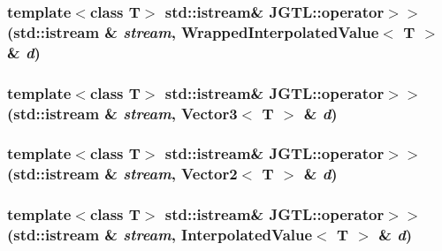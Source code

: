 \hypertarget{namespace_j_g_t_l_26e27f07434450b794de382d8b607b25}{
\subsubsection[operator$>$$>$]{\setlength{\rightskip}{0pt plus 5cm}template$<$class T$>$ std::istream\& JGTL::operator$>$$>$ (std::istream \& {\em stream}, Wrapped\-Interpolated\-Value$<$ T $>$ \& {\em d})}}
\label{namespace_j_g_t_l_26e27f07434450b794de382d8b607b25}


\hypertarget{namespace_j_g_t_l_08552e8d16a63eaef00c7e3062af4ab0}{
\subsubsection[operator$>$$>$]{\setlength{\rightskip}{0pt plus 5cm}template$<$class T$>$ std::istream\& JGTL::operator$>$$>$ (std::istream \& {\em stream}, Vector3$<$ T $>$ \& {\em d})}}
\label{namespace_j_g_t_l_08552e8d16a63eaef00c7e3062af4ab0}


\hypertarget{namespace_j_g_t_l_93f207a066e245b114cc7e00d08093b3}{
\subsubsection[operator$>$$>$]{\setlength{\rightskip}{0pt plus 5cm}template$<$class T$>$ std::istream\& JGTL::operator$>$$>$ (std::istream \& {\em stream}, Vector2$<$ T $>$ \& {\em d})}}
\label{namespace_j_g_t_l_93f207a066e245b114cc7e00d08093b3}


\hypertarget{namespace_j_g_t_l_40f708595d5793876f680b255589f642}{
\subsubsection[operator$>$$>$]{\setlength{\rightskip}{0pt plus 5cm}template$<$class T$>$ std::istream\& JGTL::operator$>$$>$ (std::istream \& {\em stream}, Interpolated\-Value$<$ T $>$ \& {\em d})}}
\label{namespace_j_g_t_l_40f708595d5793876f680b255589f642}


